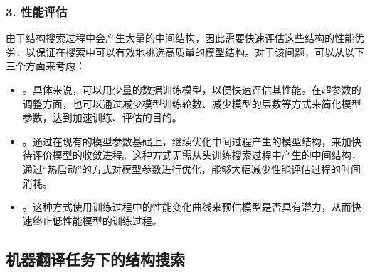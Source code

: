 
\subsubsection{3. 性能评估}\label{subsubsec-15.4.2.3}

\parinterval 由于结构搜索过程中会产生大量的中间结构，因此需要快速评估这些结构的性能优劣，以保证在搜索中可以有效地挑选高质量的模型结构。对于该问题，可以从以下三个方面来考虑：

\begin{itemize}
\vspace{0.5em}
\item {\small{}}。具体来说，可以用少量的数据训练模型，以便快速评估其性能。在超参数的调整方面，也可以通过减少模型训练轮数、减少模型的层数等方式来简化模型参数，达到加速训练、评估的目的。
\vspace{0.5em}
\item {\small{}}。通过在现有的模型参数基础上，继续优化中间过程产生的模型结构，来加快待评价模型的收敛进程。这种方式无需从头训练搜索过程中产生的中间结构，通过“热启动”的方式对模型参数进行优化，能够大幅减少性能评估过程的时间消耗。
\vspace{0.5em}
\item {\small{}}。这种方式使用训练过程中的性能变化曲线来预估模型是否具有潜力，从而快速终止低性能模型的训练过程。
\vspace{0.5em}
\end{itemize}


\subsection{机器翻译任务下的结构搜索}

